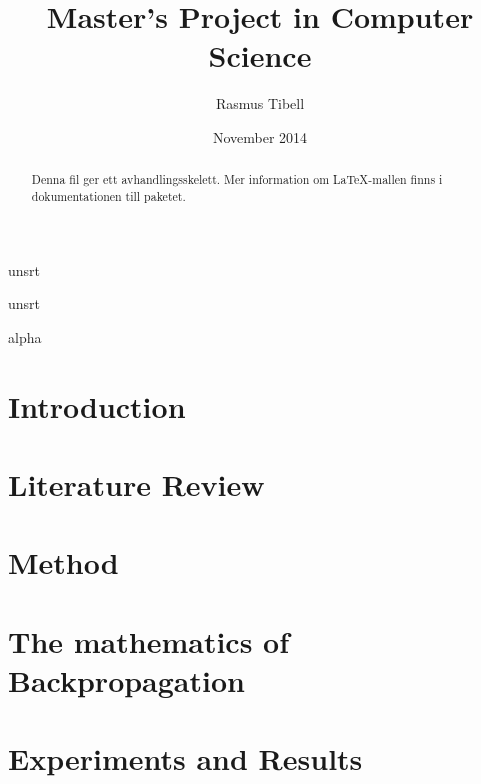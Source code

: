 \documentclass[a4paper,11pt]{kth-mag}
\title{Master's Project in Computer Science}
\author{Rasmus Tibell}
\date{November 2014}
\begin{document}

{unsrt} 

{unsrt} 

{alpha} 

\frontmatter
\maketitle

\clearpage
{}
\begin{abstract}
  Denna fil ger ett avhandlingsskelett.
  Mer information om \LaTeX-mallen finns i
  dokumentationen till paketet.
\end{abstract}
\clearpage
\tableofcontents
\mainmatter



\pagebreak
\section{Introduction}



\pagebreak
\section{Literature Review} \label{ss:literature_review}



\pagebreak
\section{Method}



\pagebreak
\section{The mathematics of Backpropagation}



\section{Experiments and Results} \label{ss:results}

 
\end{document}
